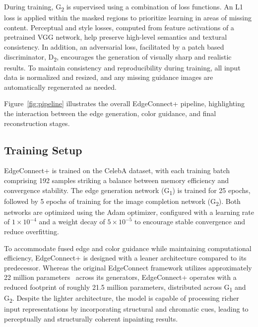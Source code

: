 During training, G\textsubscript{2} is supervised using a combination of loss functions. An L1 loss is applied within the masked regions to prioritize learning in areas of missing content. Perceptual and style losses, computed from feature activations of a pretrained VGG network, help preserve high-level semantics and textural consistency. In addition, an adversarial loss, facilitated by a patch based discriminator, D\textsubscript{2}, encourages the generation of visually sharp and realistic results. To maintain consistency and reproducibility during training, all input data is normalized and resized, and any missing guidance images are automatically regenerated as needed.

Figure~\ref{fig:pipeline} illustrates the overall EdgeConnect+ pipeline, highlighting the interaction between the edge generation, color guidance, and final reconstruction stages.

%   

\subsection{Training Setup}
\label{sec:training}

EdgeConnect+ is trained on the CelebA dataset, with each training batch comprising 192 samples striking a balance between memory efficiency and convergence stability. The edge generation network (G\textsubscript{1}) is trained for 25 epochs, followed by 5 epochs of training for the image completion network (G\textsubscript{2}). Both networks are optimized using the Adam optimizer, configured with a learning rate of $1 \times 10^{-4}$ and a weight decay of $5 \times 10^{-5}$ to encourage stable convergence and reduce overfitting.

To accommodate fused edge and color guidance while maintaining computational efficiency, EdgeConnect+ is designed with a leaner architecture compared to its predecessor. Whereas the original EdgeConnect framework utilizes approximately 22 million parameters~\cite{hertz2023any} across its generators, EdgeConnect+ operates with a reduced footprint of roughly 21.5 million parameters, distributed across G\textsubscript{1} and G\textsubscript{2}. Despite the lighter architecture, the model is capable of processing richer input representations by incorporating structural and chromatic cues, leading to perceptually and structurally coherent inpainting results.

